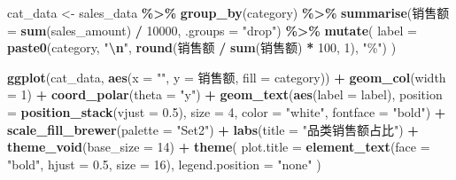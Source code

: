 \documentclass[
]{article}
\newenvironment{Shaded}{\begin{snugshade}}{\end{snugshade}}
\newcommand{\AttributeTok}[1]{\textcolor[rgb]{0.13,0.29,0.53}{#1}}
\newcommand{\DecValTok}[1]{\textcolor[rgb]{0.00,0.00,0.81}{#1}}
\newcommand{\FloatTok}[1]{\textcolor[rgb]{0.00,0.00,0.81}{#1}}
\newcommand{\FunctionTok}[1]{\textcolor[rgb]{0.13,0.29,0.53}{\textbf{#1}}}
\newcommand{\NormalTok}[1]{#1}
\newcommand{\OtherTok}[1]{\textcolor[rgb]{0.56,0.35,0.01}{#1}}
\newcommand{\SpecialCharTok}[1]{\textcolor[rgb]{0.81,0.36,0.00}{\textbf{#1}}}
\newcommand{\StringTok}[1]{\textcolor[rgb]{0.31,0.60,0.02}{#1}}
\newcounter{none} %
\begin{document}
\begin{Shaded}
\begin{Highlighting}[]
\NormalTok{cat\_data }\OtherTok{\textless{}{-}}\NormalTok{ sales\_data }\SpecialCharTok{\%\textgreater{}\%}
  \FunctionTok{group\_by}\NormalTok{(category) }\SpecialCharTok{\%\textgreater{}\%}
  \FunctionTok{summarise}\NormalTok{(销售额 }\OtherTok{=} \FunctionTok{sum}\NormalTok{(sales\_amount) }\SpecialCharTok{/} \DecValTok{10000}\NormalTok{, }\AttributeTok{.groups =} \StringTok{"drop"}\NormalTok{) }\SpecialCharTok{\%\textgreater{}\%}
  \FunctionTok{mutate}\NormalTok{(}
    \AttributeTok{label =} \FunctionTok{paste0}\NormalTok{(category, }\StringTok{"}\SpecialCharTok{\textbackslash{}n}\StringTok{"}\NormalTok{, }\FunctionTok{round}\NormalTok{(销售额 }\SpecialCharTok{/} \FunctionTok{sum}\NormalTok{(销售额) }\SpecialCharTok{*} \DecValTok{100}\NormalTok{, }\DecValTok{1}\NormalTok{), }\StringTok{"\%"}\NormalTok{)}
\NormalTok{  )}

\FunctionTok{ggplot}\NormalTok{(cat\_data, }\FunctionTok{aes}\NormalTok{(}\AttributeTok{x =} \StringTok{""}\NormalTok{, }\AttributeTok{y =}\NormalTok{ 销售额, }\AttributeTok{fill =}\NormalTok{ category)) }\SpecialCharTok{+}
  \FunctionTok{geom\_col}\NormalTok{(}\AttributeTok{width =} \DecValTok{1}\NormalTok{) }\SpecialCharTok{+}
  \FunctionTok{coord\_polar}\NormalTok{(}\AttributeTok{theta =} \StringTok{"y"}\NormalTok{) }\SpecialCharTok{+}
  \FunctionTok{geom\_text}\NormalTok{(}\FunctionTok{aes}\NormalTok{(}\AttributeTok{label =}\NormalTok{ label), }\AttributeTok{position =} \FunctionTok{position\_stack}\NormalTok{(}\AttributeTok{vjust =} \FloatTok{0.5}\NormalTok{), }
            \AttributeTok{size =} \DecValTok{4}\NormalTok{, }\AttributeTok{color =} \StringTok{"white"}\NormalTok{, }\AttributeTok{fontface =} \StringTok{"bold"}\NormalTok{) }\SpecialCharTok{+}
  \FunctionTok{scale\_fill\_brewer}\NormalTok{(}\AttributeTok{palette =} \StringTok{"Set2"}\NormalTok{) }\SpecialCharTok{+}
  \FunctionTok{labs}\NormalTok{(}\AttributeTok{title =} \StringTok{"品类销售额占比"}\NormalTok{) }\SpecialCharTok{+}
  \FunctionTok{theme\_void}\NormalTok{(}\AttributeTok{base\_size =} \DecValTok{14}\NormalTok{) }\SpecialCharTok{+}
  \FunctionTok{theme}\NormalTok{(}
    \AttributeTok{plot.title =} \FunctionTok{element\_text}\NormalTok{(}\AttributeTok{face =} \StringTok{"bold"}\NormalTok{, }\AttributeTok{hjust =} \FloatTok{0.5}\NormalTok{, }\AttributeTok{size =} \DecValTok{16}\NormalTok{),}
    \AttributeTok{legend.position =} \StringTok{"none"}
\NormalTok{  )}
\end{Highlighting}
\end{Shaded}
\end{document}
